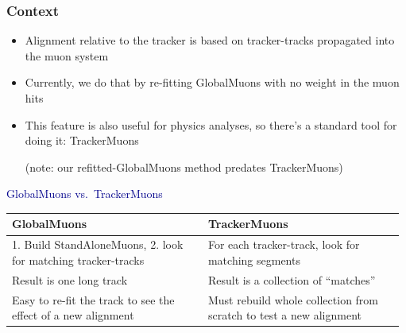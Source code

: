 \documentclass[compress]{beamer}
\begin{document}
\begin{frame}
\frametitle{Context}
\begin{itemize}
\item Alignment relative to the tracker is based on tracker-tracks propagated into the muon system
\item Currently, we do that by re-fitting GlobalMuons with no weight in the muon hits
\item This feature is also useful for physics analyses, so there's a standard tool for doing it: TrackerMuons

(note: our refitted-GlobalMuons method predates TrackerMuons)
\end{itemize}

\vfill
\hspace{-0.83 cm} \textcolor{darkblue}{\Large GlobalMuons vs.\ TrackerMuons}

\vspace{0.2 cm}
\renewcommand{\arraystretch}{1.2}
\begin{tabular}{p{0.49\linewidth} p{0.49\linewidth}}
GlobalMuons & TrackerMuons \\\hline
1. Build StandAloneMuons, 2. look for matching tracker-tracks & For each tracker-track, look for matching segments \\
Result is one long track & Result is a collection of ``matches'' \\
Easy to re-fit the track to see the effect of a new alignment & Must rebuild whole collection from scratch to test a new alignment \\
\end{tabular}
\end{frame}
\end{document}

